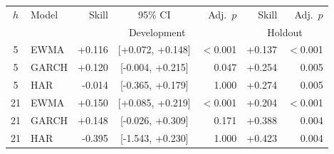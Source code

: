 \begin{tabular}{clrcrrr}
\toprule
$h$ & Model & Skill & 95\% CI & Adj.\ $p$ & Skill & Adj.\ $p$ \\
 & & \multicolumn{3}{c}{Development} & \multicolumn{2}{c}{Holdout} \\
\midrule
5 & EWMA & +0.116 & [+0.072, +0.148] & $<$0.001 & +0.137 & $<$0.001 \\
5 & GARCH & +0.120 & [-0.004, +0.215] & 0.047 & +0.254 & 0.005 \\
5 & HAR & -0.014 & [-0.365, +0.179] & 1.000 & +0.274 & 0.005 \\
21 & EWMA & +0.150 & [+0.085, +0.219] & $<$0.001 & +0.204 & $<$0.001 \\
21 & GARCH & +0.148 & [-0.026, +0.309] & 0.171 & +0.388 & 0.004 \\
21 & HAR & -0.395 & [-1.543, +0.230] & 1.000 & +0.423 & 0.004 \\
\bottomrule
\end{tabular}
